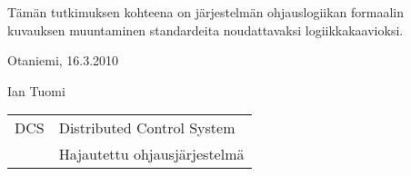 \documentclass[finnish,12pt]{article}
\begin{document}
	
	


	\author{Ian Tuomi}

	
	\begin{abstractpage}[finnish]
  
Tämän tutkimuksen kohteena on järjestelmän ohjauslogiikan formaalin kuvauksen
muuntaminen standardeita noudattavaksi logiikkakaavioksi.
  
	\end{abstractpage}

	\newpage
	\vspace{10cm}







	\vspace{5cm}

Otaniemi, 16.3.2010

	\vspace{5mm}
	{\hfill Ian Tuomi \hspace{1cm}}

	\newpage


	\tableofcontents



	\begin{tabular}{ll}
DCS        & Distributed Control System \\
	     & Hajautettu ohjausjärjestelmä

	\end{tabular}
\end{document}
